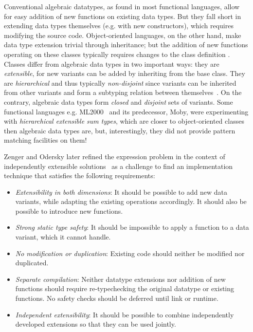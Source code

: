 Conventional algebraic datatypes, as found in most functional languages,
allow for easy addition of new functions on existing data types.
But they fall short in extending data types themselves 
(e.g. with new constructors), 
which requires modifying the source code. Object-oriented languages, on the 
other hand, make data type extension trivial through inheritance;
but the addition of new functions operating on these classes typically
requires changes to the class definition \cite{Cook90,exprproblem}. 
Classes differ from algebraic data  types in two important ways: they
are \emph{extensible}, for new variants can be added by inheriting from
the base class.  They are \emph{hierarchical} and thus typically
\emph{non-disjoint} since variants can be inherited from other variants
and form a subtyping relation between themselves~\cite{Glew99}. 
On the contrary, algebraic data types form \emph{closed} and \emph{disjoint}
sets of variants. Some functional languages e.g. ML2000~\cite{ML2000}
and its predecessor, Moby, were experimenting with 
\emph{hierarchical extensible sum types}, which are closer to 
object-oriented classes then algebraic data types are, but, 
interestingly, they did not provide pattern matching facilities on them!

Zenger and Odersky later refined the expression problem in the context of 
independently extensible solutions~\cite{fool12} as a challenge to find an 
implementation technique that satisfies the following requirements:

\begin{itemize}
\setlength{\itemsep}{0pt}
\setlength{\parskip}{0pt}
\item \emph{Extensibility in both dimensions}: It should be possible to add new 
      data variants, while adapting the existing operations accordingly. It 
      should also be possible to introduce new functions. 
\item \emph{Strong static type safety}: It should be impossible to apply a 
      function to a data variant, which it cannot handle. 
\item \emph{No modification or duplication}: Existing code should neither be 
      modified nor duplicated.
\item \emph{Separate compilation}: Neither datatype extensions nor addition of 
      new functions should require re-typechecking the original datatype or 
      existing functions. No safety checks should be deferred until link or 
      runtime.
\item \emph{Independent extensibility}: It should be possible to combine 
      independently developed extensions so that they can be used jointly.
\end{itemize}


